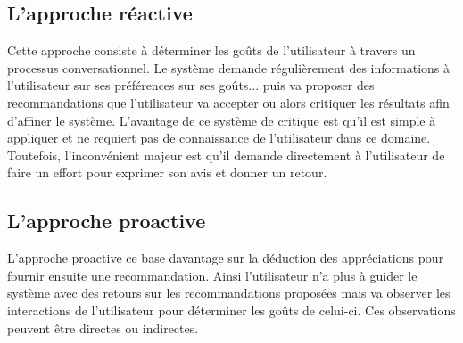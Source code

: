 \documentclass{report}
\begin{document}
\subsection{L'approche réactive}
Cette approche consiste à déterminer les goûts de l'utilisateur à travers un processus conversationnel. Le système demande régulièrement des informations à l'utilisateur sur ses préférences sur ses goûts... puis va proposer des recommandations que l'utilisateur va accepter ou alors critiquer les résultats afin d'affiner le système.
L'avantage de ce système de critique est qu'il est simple à appliquer et ne requiert pas de connaissance de l'utilisateur dans ce domaine. Toutefois, l'inconvénient majeur est qu'il demande directement à l'utilisateur de faire un effort pour exprimer son avis et donner un retour.

\subsection{L'approche proactive}
L'approche proactive ce base davantage sur la déduction des appréciations pour fournir ensuite une recommandation. Ainsi l'utilisateur n'a plus à guider le système avec des retours sur les recommandations proposées mais va observer les interactions de l'utilisateur pour déterminer les goûts de celui-ci.
Ces observations peuvent être directes ou indirectes.
\end{document}
